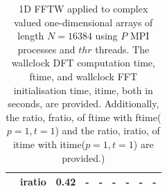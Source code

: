 \documentclass[a4paper]{article}
\begin{document}
\begin{table}[htbp]
\begin{center}
\begin{small}
\begin{tabular}{|r|r|r|r|r|r|r|r|r|}
     &  iratio &   0.42 &  - &  - &  - &  - &  - &  - \\ \hline
\end{tabular}
\caption{1D FFTW applied to complex valued one-dimensional arrays of length $N=16384$ using $P$ MPI processes and $thr$ threads. The wallclock DFT computation time, ftime, and wallclock FFT initialisation time, itime, both in seconds, are provided. Additionally, the ratio, fratio, of ftime  with ftime($p=1,t=1$) and the ratio, iratio, of itime  with itime($p=1,t=1$) are provided.) }\label{Tbl:FFT1d16384}
\end{small}
\end{center}
\end{table}
\end{document}
